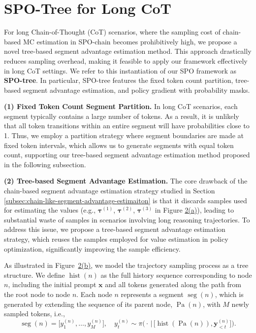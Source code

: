 \vspace{-0.2cm}
\section{SPO-Tree for Long CoT}
\vspace{-0.2cm}
\label{sec:tree-like-spo-for-long-cot-scenario}
For long Chain-of-Thought (CoT) scenarios, where the sampling cost of chain-based MC estimation in SPO-chain becomes prohibitively high, we propose a novel tree-based segment advantage estimation method. This approach drastically reduces sampling overhead, making it feasible to apply our framework effectively in long CoT settings. We refer to this instantiation of our SPO framework as \textbf{SPO-tree}. In particular, SPO-tree features the fixed token count partition, tree-based segment advantage estimation, and policy gradient with probability masks.

\noindent\textbf{(1) Fixed Token Count Segment Partition.}
\label{subsec:segment-partition-based-on-fixed-token-intervals}
In long CoT scenarios, each segment typically contains a large number of tokens. As a result, it is unlikely that all token transitions within an entire segment will have probabilities close to 1. Thus, we employ a partition strategy where segment boundaries are made at fixed token intervals, which allows us to generate segments with equal token count, supporting our tree-based segment advantage estimation method proposed in the following subsection.

\noindent\textbf{(2) Tree-based Segment Advantage Estimation.}
\label{subsec:tree-like-segment-advantage-estimation}
The core drawback of the chain-based segment advantage estimation strategy studied in Section \ref{subsec:chain-like-segment-advantage-estimaiton} is that it discards samples used for estimating the values (e.g., $\boldsymbol \tau^{(1)}$, $\boldsymbol \tau^{(2)}$, $\boldsymbol \tau^{(3)}$ in Figure \hyperref[fig:sampling_method]{2(a)}), leading to substantial waste of samples in scenarios involving long reasoning trajectories. To address this issue, we propose a tree-based segment advantage estimation strategy, which reuses the samples employed for value estimation in policy optimization, significantly improving the sample efficiency.

As illustrated in Figure~\hyperref[fig:sampling_method]{2(b)}, we model the trajectory sampling process as a tree structure. We define \(\operatorname{hist}(n)\) as the full history sequence corresponding to node \( n \), including the initial prompt \(\boldsymbol{x}\) and all tokens generated along the path from the root node to node \( n \). Each node \( n \) represents a segment \(\operatorname{seg}(n)\), which is generated by extending the sequence of its parent node, \(\operatorname{Pa}(n)\), with \(M\) newly sampled tokens, i.e., 
\[
\operatorname{seg}(n) = \big[y^{(n)}_1, \dots, y^{(n)}_{M}\big], \quad y^{(n)}_t \sim \pi\big(\cdot\,\big|\,\big[\operatorname{hist}(\operatorname{Pa}(n)), \boldsymbol y^{(n)}_{<t}\big]\big).
\]

